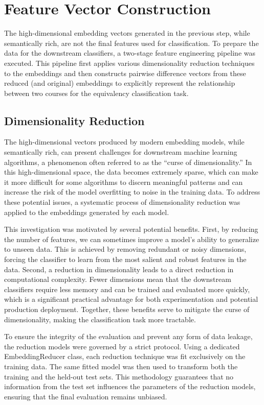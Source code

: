 \section{Feature Vector Construction}
The high-dimensional embedding vectors generated in the previous step, while semantically rich, are not the final features used for classification. To prepare the data for the downstream classifiers, a two-stage feature engineering pipeline was executed. This pipeline first applies various dimensionality reduction techniques to the embeddings and then constructs pairwise difference vectors from these reduced (and original) embeddings to explicitly represent the relationship between two courses for the equivalency classification task.

\subsection{Dimensionality Reduction}
The high-dimensional vectors produced by modern embedding models, while semantically rich, can present challenges for downstream machine learning algorithms, a phenomenon often referred to as the ``curse of dimensionality.'' In this high-dimensional space, the data becomes extremely sparse, which can make it more difficult for some algorithms to discern meaningful patterns and can increase the risk of the model overfitting to noise in the training data. To address these potential issues, a systematic process of dimensionality reduction was applied to the embeddings generated by each model.

This investigation was motivated by several potential benefits. First, by reducing the number of features, we can sometimes improve a model's ability to generalize to unseen data. This is achieved by removing redundant or noisy dimensions, forcing the classifier to learn from the most salient and robust features in the data. Second, a reduction in dimensionality leads to a direct reduction in computational complexity. Fewer dimensions mean that the downstream classifiers require less memory and can be trained and evaluated more quickly, which is a significant practical advantage for both experimentation and potential production deployment. Together, these benefits serve to mitigate the curse of dimensionality, making the classification task more tractable.

To ensure the integrity of the evaluation and prevent any form of data leakage, the reduction models were governed by a strict protocol. Using a dedicated EmbeddingReducer class, each reduction technique was fit exclusively on the training data. The same fitted model was then used to transform both the training and the held-out test sets. This methodology guarantees that no information from the test set influences the parameters of the reduction models, ensuring that the final evaluation remains unbiased.

